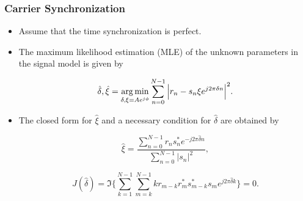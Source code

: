 \begin{frame}
  \frametitle{Carrier Synchronization}
    \begin{itemize}
    
       \item Assume that the time synchronization is perfect.
       \item The maximum likelihood estimation (MLE) of the unknown parameters in the signal model is given by
       
       \begin{equation*}
        \label{eq:ML_f_xi}
        \hat{\delta},\hat{\xi}=\operatorname*{arg\,min}_{\delta,\xi=Ae^{j\phi}}\sum_{n=0}^{N-1}\Big|r_n-s_n\xi e^{j2\pi\delta n}\Big|^{2}.
      \end{equation*}

      \item The closed form for $\hat{\xi}$ and a necessary condition for $\hat{\delta}$ are obtained by
      
      
      \begin{equation*}
        \label{eq:opt_xi}
        \hat{\xi}=\frac{\sum_{n=0}^{N-1}{r_{n}s_n^{*}e^{-j2\pi\hat{\delta} n}}}{\sum_{n=0}^{N-1}|s_{n}|^2},
      \end{equation*}

      \begin{equation*}
        \label{eq:necessary condition for delta}
        J(\hat{\delta}) = \Im\bigg\{\sum_{k=1}^{N-1}{\sum_{m=k}^{N-1}{kr_{m-k}r_m^{*}s_{m-k}^{*}s_m}e^{j2\pi\hat{\delta}k}}\bigg\}=0.
      \end{equation*}

    \end{itemize}


\end{frame}


